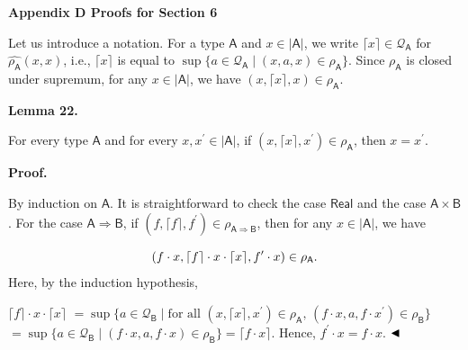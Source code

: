 \documentclass[10pt,a4paper]{amsart}
\begin{document}
 
 


 
\par\medskip\noindent\textbf{Appendix D Proofs for Section 6}\par
 
 
Let us introduce a notation. For a type $\mathsf{A}$ and $x\in|\mathsf{A}|$, we write $\lceil x\rceil\in\mathcal{Q}_{\mathsf{A}}$ for $\widehat{\rho_{\mathsf{A}}}(x,x)$, i.e., $\lceil x\rceil$ is equal to $\sup\{a\in\mathcal{Q}_{\mathsf{A}}\mid(x,a,x)\in\rho_{\mathsf{A}}\}.$ Since $\rho_{\mathsf{A}}$ is closed under supremum, for any $x\in|\mathsf{A}|$, we have $(x,\lceil x\rceil,x)\in\rho_{\mathsf{A}}$.\par
 
 
 
\par\medskip\noindent\textbf{Lemma 22.}\par
 
 
For every type $\mathsf{A}$ and for every $x,x^{\prime}\in|\mathsf{A}|$, if $(x,\lceil x\rceil,x^{\prime})\in\rho_{\mathsf{A}}$, then $x=x^{\prime}$.\par
 
 
 
 
\par\medskip\noindent\textbf{Proof.}\par
 
 
By induction on $\mathsf{A}$. It is straightforward to check the case $\mathsf{Real}$ and the case $\mathsf{A}\times\mathsf{B}$. For the case $\mathsf{A}\Rightarrow\mathsf{B}$, if $(f,\lceil f\rceil,f^{\prime})\in\rho_{\mathsf{A}\Rightarrow\mathsf{B}}$, then for any $x\in|\mathsf{A}|$, we have\par
    \[(f\cdot x,\lceil f\rceil\cdot x\cdot\lceil x\rceil,f^{\prime}\cdot x)\in\rho_{%
\mathsf{A}}.\]    
Here, by the induction hypothesis,\par
    $\displaystyle\lceil f\rceil\cdot x\cdot\lceil x\rceil$ $\displaystyle=\sup\{a\in\mathcal{Q}_{\mathsf{B}}\mid\text{for all }(x,\lceil x%
\rceil,x^{\prime})\in\rho_{\mathsf{A}},\,(f\cdot x,a,f\cdot x^{\prime})\in\rho%
_{\mathsf{B}}\}$      $\displaystyle=\sup\{a\in\mathcal{Q}_{\mathsf{B}}\mid(f\cdot x,a,f\cdot x)\in%
\rho_{\mathsf{B}}\}=\lceil f\cdot x\rceil.$    
Hence, $f^{\prime}\cdot x=f\cdot x$. $\hfill\blacktriangleleft$\par
 
\end{document}
